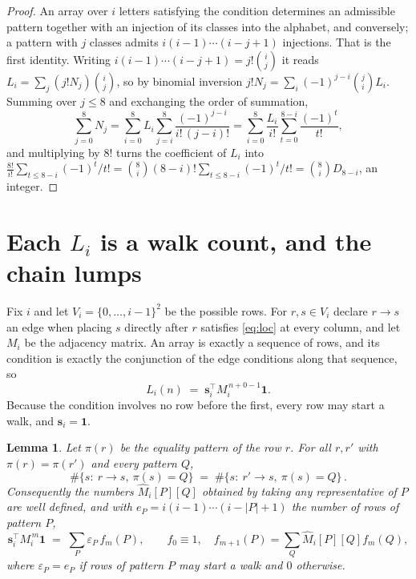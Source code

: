 \documentclass[11pt,a4paper]{article}
\theoremstyle{plain}
\newtheorem{lemma}[theorem]{Lemma}
\theoremstyle{definition}
\begin{document}
\begin{proof}
An array over $i$ letters satisfying the condition determines an admissible pattern together
with an injection of its classes into the alphabet, and conversely; a pattern with $j$
classes admits $i(i-1)\cdots(i-j+1)$ injections. That is the first identity. Writing
$i(i-1)\cdots(i-j+1)=j!\binom{i}{j}$ it reads $L_i=\sum_j (j!N_j)\binom{i}{j}$, so by
binomial inversion $j!N_j=\sum_{i}(-1)^{j-i}\binom{j}{i}L_i$. Summing over
$j\le 8$ and exchanging the order of summation,
\[
\sum_{j=0}^{8}N_j=\sum_{i=0}^{8}L_i\sum_{j=i}^{8}\frac{(-1)^{j-i}}{i!\,(j-i)!}
=\sum_{i=0}^{8}\frac{L_i}{i!}\sum_{t=0}^{8-i}\frac{(-1)^t}{t!} ,
\]
and multiplying by $8!$ turns the coefficient of $L_i$ into
$\frac{8!}{i!}\sum_{t\le 8-i}(-1)^t/t!=\binom{8}{i}(8-i)!\sum_{t\le 8-i}(-1)^t/t!
=\binom{8}{i}D_{8-i}$, an integer.
\end{proof}

\section{Each $L_i$ is a walk count, and the chain lumps}

Fix $i$ and let $V_i=\{0,\dots,i-1\}^{2}$ be the possible rows. For $r,s\in V_i$
declare $r\to s$ an edge when placing $s$ directly after $r$ satisfies \eqref{eq:loc} at
every column, and let $M_i$ be the adjacency matrix. An array is exactly a sequence of
rows, and its condition is exactly the conjunction of the edge conditions along that
sequence, so
\[
L_i(n)\;=\;\mathbf{s}_i^{\!\top}M_i^{\,n+0-1}\mathbf{1} .
\]
Because the condition involves no row before the first, every
row may start a walk, and $\mathbf{s}_i=\mathbf{1}$.

\begin{lemma}\label{lem:lump}
Let $\pi(r)$ be the equality pattern of the row $r$. For all $r,r'$ with
$\pi(r)=\pi(r')$ and every pattern $Q$,
\[
\#\{s:\ r\to s,\ \pi(s)=Q\}\;=\;\#\{s:\ r'\to s,\ \pi(s)=Q\}\, .
\]
Consequently the numbers $\widehat M_i[P][Q]$ obtained by taking any representative of $P$
are well defined, and with $e_P=i(i-1)\cdots(i-|P|+1)$ the number of rows of pattern $P$,
\[
\mathbf{s}_i^{\!\top}M_i^{\,m}\mathbf{1}\;=\;\sum_P \varepsilon_P\,f_m(P),
\qquad f_0\equiv1,\quad f_{m+1}(P)=\sum_Q\widehat M_i[P][Q]f_m(Q),
\]
where $\varepsilon_P=e_P$ if rows of pattern $P$ may start a walk and $0$ otherwise.
\end{lemma}
\end{document}
